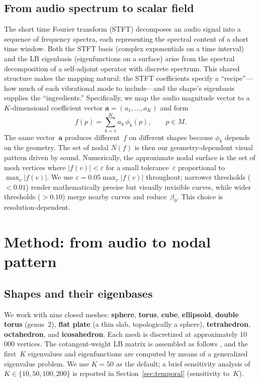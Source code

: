 \documentclass[]{interact}
\theoremstyle{plain}
\theoremstyle{definition}
\theoremstyle{remark}
\begin{document}
\subsection{From audio spectrum to scalar field}
\label{sec:mapping}

The short time Fourier transform (STFT) decomposes an audio signal into a sequence of frequency spectra, each representing the spectral content of a short time window. Both the STFT basis (complex exponentials on a time interval) and the LB eigenbasis (eigenfunctions on a surface) arise from the spectral decomposition of a self-adjoint operator with discrete spectrum. This shared structure makes the mapping natural: the STFT coefficients specify a ``recipe''---how much of each vibrational mode to include---and the shape's eigenbasis supplies the ``ingredients.'' Specifically, we map the audio magnitude vector to a $K$-dimensional coefficient vector $\mathbf{a} = (a_1,\ldots,a_K)$ and form
\begin{equation}
\label{eq:field}
f(p) = \sum_{k=1}^{K} a_k\,\phi_k(p), \qquad p \in M.
\end{equation}
The same vector~$\mathbf{a}$ produces different~$f$ on different shapes because $\phi_k$ depends on the geometry. The set of nodal $N(f)$ is then our geometry-dependent visual pattern driven by sound. Numerically, the approximate nodal surface is the set of mesh vertices where $|f(v)| < \varepsilon$ for a small tolerance~$\varepsilon$ proportional to $\max_v |f(v)|$. We use $\varepsilon = 0.05\max_v|f(v)|$ throughout; narrower thresholds ($<0.01$) render mathematically precise but visually invisible curves, while wider thresholds ($>0.10$) merge nearby curves and reduce~$\beta_0$. This choice is resolution-dependent.

\section{Method: from audio to nodal pattern}
\label{sec:method}

\subsection{Shapes and their eigenbases}

We work with nine closed meshes: \textbf{sphere}, \textbf{torus}, \textbf{cube}, \textbf{ellipsoid}, \textbf{double torus} (genus~2), \textbf{flat plate} (a thin slab, topologically a sphere), \textbf{tetrahedron}, \textbf{octahedron}, and \textbf{icosahedron}. Each mesh is discretized at approximately 10 \,000 vertices. The cotangent-weight LB matrix is assembled as follows \citet{meyer2002,pinkall1993}, and the first~$K$ eigenvalues and eigenfunctions are computed by means of a generalized eigenvalue problem. We use $K=50$ as the default; a brief sensitivity analysis of $K\in\{10,50,100,200\}$ is reported in Section~\ref{sec:temporal} (sensitivity to~$K$).
\end{document}

